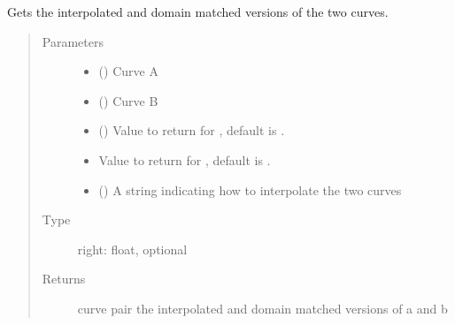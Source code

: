 \documentclass[letterpaper,10pt,english]{sphinxmanual}
\begin{document}
\begin{fulllineitems}
\label{\detokenize{pydv:curve.getinterp}}
Gets the interpolated and domain matched versions of the two curves.
\begin{quote}\begin{description}
\item[{Parameters}] \leavevmode\begin{itemize}
\item {} 
 () \textendash{} Curve A

\item {} 
 () \textendash{} Curve B

\item {} 
 (\sphinxstyleliteralemphasis{\sphinxupquote{, }}) \textendash{} Value to return for , default is .

\item {} 
 \textendash{} Value to return for , default is .

\item {} 
\sphinxstyleliteralstrong{\sphinxupquote{,}}\sphinxstyleliteralstrong{\sphinxupquote{,}} () \textendash{} A string indicating how to interpolate the two curves

\end{itemize}

\item[{Type}] \leavevmode
right: float, optional

\item[{Returns}] \leavevmode
curve pair \textendash{} the interpolated and domain matched versions of a and b

\end{description}\end{quote}

\end{fulllineitems}
\end{document}

